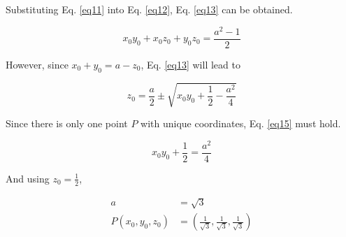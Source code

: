 Substituting Eq. \ref{eq11} into Eq. \ref{eq12}, Eq. \ref{eq13} can be obtained.

\begin{equation}
x_0y_0 + x_0z_0 + y_0z_0 = \frac{a^2-1}{2}
\label{eq13}
\end{equation}

However, since $x_0 + y_0 = a - z_0$, Eq. \ref{eq13} will lead to

\begin{equation}
z_0 = \frac{a}{2} \pm \sqrt{x_0y_0 + \frac{1}{2} - \frac{a^2}{4}}
\label{eq14}
\end{equation}

Since there is only one point $P$ with unique coordinates, Eq. \ref{eq15} must hold.

\begin{equation}
x_0y_0 + \frac{1}{2} = \frac{a^2}{4}
\label{eq15}
\end{equation}

And using $z_0 = \frac{1}{2}$,

\begin{equation}
\begin{aligned}
a &= \sqrt{3}\\
P(x_0, y_0, z_0) &= (\frac{1}{\sqrt{3}},\frac{1}{\sqrt{3}},\frac{1}{\sqrt{3}})
\end{aligned}
\label{eq16}
\end{equation}

